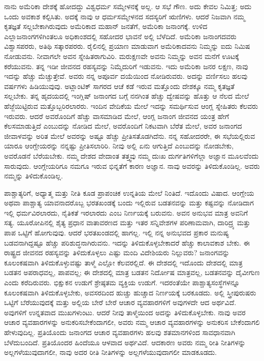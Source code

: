 \vskip 0.2cm

ನಾನು ಅಮೆರಿಕಾ ದೇಶಕ್ಕೆ ಹೋದದ್ದು ವಿಶ್ವಧರ್ಮ ಸಮ್ಮೇಳನಕ್ಕೆ ಅಲ್ಲ. ಆ ಸಭೆ ಗೌಣ. ಅದು ಕೇವಲ ನಿಮಿತ್ತ; ಅದು ಒಂದು ಅವಕಾಶ ಕಲ್ಪಿಸಿತು. ಅದಕ್ಕೆ ನಾವು ಆ ಧರ್ಮಸಮ್ಮೇಳನದ ಸದಸ್ಯರಿಗೆ ಋಣಿಗಳು. ಆದರೆ ನಿಜವಾಗಿ ನಮ್ಮ ಕೃತಜ್ಞತೆ ಸಲ್ಲಬೇಕಾಗಿರುವುದು ಅಮೆರಿಕಾದ ಮಹಾನ್​ ಜನತೆಗೆ, ಅಮೆರಿಕಾ ಜನಾಂಗಕ್ಕೆ. ಉಳಿದ ಎಲ್ಲಾ\break ಜನಾಂಗಗಳಿಗಿಂತಲೂ ಅಧಿಕಾಂಶದಲ್ಲಿ ಸಹೋದರ ಭಾವನೆ ಅಲ್ಲಿ ಬೆಳೆದಿದೆ. ಅಮೆರಿಕಾ ಜನಾಂಗದವರು ವಿಶ್ವಾಸಪರರು, ಅತಿಥಿ ಸತ್ಕಾರಪರರು. ರೈಲಿನಲ್ಲಿ ಪ್ರಯಾಣ ಮಾಡುವಾಗ ಅಮೆರಿಕಾದವನು ನಿಮ್ಮನ್ನು ಐದು ನಿಮಿಷ ನೋಡುವನು. ನೀವಾಗಲೇ ಅವನ ಸ್ನೇಹಿತರಾಗುವಿರಿ. ಮರುಕ್ಷಣವೇ ಅವನು ನಿಮ್ಮನ್ನು ಅವನ ಮನೆಗೆ ಊಟಕ್ಕೆ ಕರೆಯುವನು. ತನ್ನ ಇಡೀ ಜೀವನದ ರಹಸ್ಯವನ್ನು ನಿಮ್ಮೆದುರಿಗೆ ಇಡುವನು. ಇದು ಅಮೆರಿಕಾ ಜನರ ಲಕ್ಷಣ, ನಾವು ಇದನ್ನು ಹೆಚ್ಚು ಮೆಚ್ಚುತ್ತೇವೆ. ಅವರು ನನ್ನ ಅಪೂರ್ವ ದಯೆಯಿಂದ ನೋಡಿರುವರು. ಅದನ್ನು ವರ್ಣಿಸಲು ಹಲವು ವರ್ಷಗಳು ಹಿಡಿಯುವುವು. ಅಟ್ಲಾಂಟಿಕ್​ ಸಾಗರದ ಆಚೆ ಕಡೆ ಇರುವ ಮತ್ತೊಂದು ದೇಶಕ್ಕೂ ನಮ್ಮ ಕೃತಜ್ಞತೆ ಸಲ್ಲಬೇಕು. ತನ್ನ ಹೃದಯದಲ್ಲಿ ಇಂಗ್ಲಿಷ್​ ಜನಾಂಗದ ಬಗ್ಗೆ ನನಗಿಂತ ಹೆಚ್ಚು ದ್ವೇಷವನ್ನು ಹೊತ್ತು ಆ ನೆಲದ ಮೇಲೆ ಹೆಜ್ಜೆಯಿಟ್ಟಿರುವ ಮತ್ತೊಬ್ಬರಿರಲಾರರು. ಇಂದಿನ ವೇದಿಕೆಯ ಮೇಲೆ ಇದನ್ನು ಸಮರ್ಥಿಸುವ ಆಂಗ್ಲ ಸ್ನೇಹಿತರು ಕೆಲವರು ಇರುವರು. ಆದರೆ ಅವರೊಂದಿಗೆ ಹೆಚ್ಚು ವಾಸಮಾಡಿದ ಮೇಲೆ, ಆಂಗ್ಲ ಜನಾಂಗ ಜೀವನದ ಯಂತ್ರ ಹೇಗೆ ಕೆಲಸಮಾಡುತ್ತಿದೆ ಎಂಬುದನ್ನು ನೋಡಿದ ಮೇಲೆ, ಅವರೊಂದಿಗೆ ನಿಕಟವಾಗಿ ಬೆರೆತ ಮೇಲೆ, ಅವರ ಜನಾಂಗದ ಜೀವಾಳವನ್ನು ಅರಿತ ಮೇಲೆ ಅವರನ್ನು ಅಷ್ಟೂ ಹೆಚ್ಚು ಪ್ರೀತಿಸತೊಡಗಿದೆನು. ನನ್ನ ಸಹೋದರರೇ, ಈ ಸಭೆಯಲ್ಲಿರುವ ಯಾರೂ ಆಂಗ್ಲೇಯರನ್ನು ನನ್ನಷ್ಟು ಪ್ರೀತಿಸಲಾರಿರಿ. ನೀವು ಅಲ್ಲಿ ಏನು ಆಗುತ್ತಿದೆ ಎಂಬುದನ್ನು ನೋಡಬೇಕು, ಅವರೊಡನೆ ಬೆರೆಯಬೇಕು. ನಮ್ಮ ದೇಶದ ವೇದಾಂತ ತತ್ತ್ವವು ನಮ್ಮ ದುಃಖ ದುರ್ಗತಿಗಳಿಗೆಲ್ಲಾ ಅಜ್ಞಾನ ಮೂಲವೆಂದು ಸಾರುವುದು. ಆಂಗ್ಲೇಯರಿಗೂ ನಮಗೂ ಇರುವ ಭಿನ್ನತೆಗೆ ಕಾರಣ ಅಜ್ಞಾನ. ನಾವು ಅವರನ್ನು ತಿಳಿದುಕೊಂಡಿಲ್ಲ. ಅವರು ನಮ್ಮನ್ನು ತಿಳಿದುಕೊಂಡಿಲ್ಲ.

\vskip 0.2cm

ಪಾಶ್ಚಾತ್ಯರಿಗೆ, ಅಧ್ಯಾತ್ಮ ಮತ್ತು ನೀತಿ ಕೂಡ ಪ್ರಾಪಂಚಿಕ ಉನ್ನತಿಯ ಮೇಲೆ ನಿಂತಿದೆ. ಇದೊಂದು ವಿಷಾದ. ಆಂಗ್ಲೇಯ ಅಥವಾ ಪಾಶ್ಚಾತ್ಯ ಯಾವನಾದರೊಬ್ಬ ಭರತಖಂಡಕ್ಕೆ ಬಂದು ಇಲ್ಲಿರುವ ಬಡತನವನ್ನು ಮತ್ತು ಕಷ್ಟವನ್ನು ನೋಡಿದಾಗ ಇಲ್ಲಿ ಧರ್ಮವಿರಲಾರದು, ನೈತಿಕತೆ ಇರಲಾರದು ಎಂಬ ನಿರ್ಣಯಕ್ಕೆ ಬರುವನು. ಅವನ ಅನುಭವ ಮಾತ್ರ ಅವನಿಗೆ ಸತ್ಯ. ಯೂರೋಪಿನಲ್ಲಿ ಶೈತ್ಯ ಪ್ರಧಾನ ವಾತಾವರಣದ ಮತ್ತು ಇತರ ಸನ್ನಿವೇಶಗಳ ಪರಿಣಾಮವಾಗಿ, ದಾರಿದ್ರ್ಯ ಮತ್ತು ಪಾಪ ಒಟ್ಟಿಗೆ ಹೋಗುವುವು. ಆದರೆ ಭರತಖಂಡದಲ್ಲಿ ಹಾಗಲ್ಲ. ಇಲ್ಲಿ ನನ್ನ ಅನುಭವದ ಪ್ರಕಾರ ಮನುಷ್ಯ ಬಡವನಾಗಿದ್ದಷ್ಟೂ ಹೆಚ್ಚು ಪರಿಶುದ್ಧನಾಗಿರುವನು. ಇದನ್ನು ತಿಳಿದುಕೊಳ್ಳಬೇಕಾದರೆ ಹೆಚ್ಚು ಕಾಲಾವಕಾಶ ಬೇಕು. ಈ ರಾಷ್ಟ್ರದ ಜೀವನದ ರಹಸ್ಯವನ್ನು ತಿಳಿದುಕೊಳ್ಳಲು ಎಷ್ಟು ಮಂದಿ ವಿದೇಶಿಯರು ನಿಲ್ಲುವರು? ಜನಾಂಗವನ್ನು ಕೂಲಂಕಷವಾಗಿ ತಿಳಿದುಕೊಳ್ಳುವಷ್ಟು ತಾಳ್ಮೆ ಎಲ್ಲೋ ಕೆಲವರಲ್ಲಿದೆ. ಈ ದೇಶದಲ್ಲಿ ಇದೊಂದು ದೇಶದಲ್ಲಿ ಮಾತ್ರ ಬಡತನ ಅಪರಾಧವಲ್ಲ, ಪಾಪವಲ್ಲ; ಈ ದೇಶದಲ್ಲಿ ಮಾತ್ರ ಬಡತನ ನಿರ್ದೋಷ ಮಾತ್ರವಲ್ಲ, ಬಡತನವನ್ನು ದೈವೀಗುಣ ಎಂದು ಕರೆದಿರುವರು. ಭಿಕ್ಷುಕನ ಉಡುಗೆ ಶ್ರೇಷ್ಠತಮ ವ್ಯಕ್ತಿಯ ಉಡುಗೆ. ಇದರಂತೆಯೇ ಪಾಶ್ಚಾತ್ಯ\break ಸಂಸ್ಥೆಗಳನ್ನೂ ಕೂಲಂಕಷವಾಗಿ ತಿಳಿದುಕೊಳ್ಳಬೇಕು, ಅವಸರದಿಂದ ಹುಚ್ಚು ಹುಚ್ಚಾದ ನಿರ್ಣಯಕ್ಕೆ ಬರಕೂಡದು. ಅಲ್ಲಿ ಸ್ತ್ರೀಪುರುಷರು ಒಟ್ಟಿಗೆ ಬೆರೆಯುವುದಕ್ಕೆ ಮತ್ತು ಅಲ್ಲಿಯ ಬೇರೆ ಬೇರೆ ಆಚಾರ ವ್ಯವಹಾರಗಳಿಗೆ ಅವುಗಳದೇ ಆದ ಅರ್ಥವಿದೆ. ಅವುಗಳಿಗೆ ಉನ್ನತವಾದ ಮುಖಗಳುಂಟು. ಆದರೆ ನೀವು ತಾಳ್ಮೆಯಿಂದ ಅದನ್ನು ತಿಳಿದುಕೊಳ್ಳಬೇಕು. ನಾವು ಅವರ ಆಚಾರ ವ್ಯವಹಾರಗಳನ್ನು ಅನುಕರಿಸಬೇಕೆಂದಾಗಲೀ, ಅವರು ನಮ್ಮ ಆಚಾರ ವ್ಯವಹಾರಗಳನ್ನು ಅನುಕರಿಸ ಬೇಕೆಂದಾಗಲಿ ಹೇಳುವುದಿಲ್ಲ. ಪ್ರತಿಯೊಂದು ಜನಾಂಗದ ಆಚಾರ ವ್ಯವಹಾರಗಳು ಹಲವು ಶತಮಾನಗಳಿಂದ ಸಾವಧಾನವಾಗಿ ಬೆಳೆದುಬಂದಿದೆ. ಪ್ರತಿಯೊಂದರ ಹಿಂದೆಯೂ ಆಳವಾದ ಅರ್ಥವಿದೆ. ಆದಕಾರಣ ಅವರು ನಮ್ಮ ರೀತಿ ನೀತಿಗಳನ್ನು ಅಲ್ಲಗಳೆಯುವುದಾಗಲೀ, ನಾವು ಅದರ ರೀತಿ ನೀತಿಗಳನ್ನು ಅಲ್ಲಗಳೆಯುವುದಾಗಲೀ ಮಾಡಕೂಡದು.

